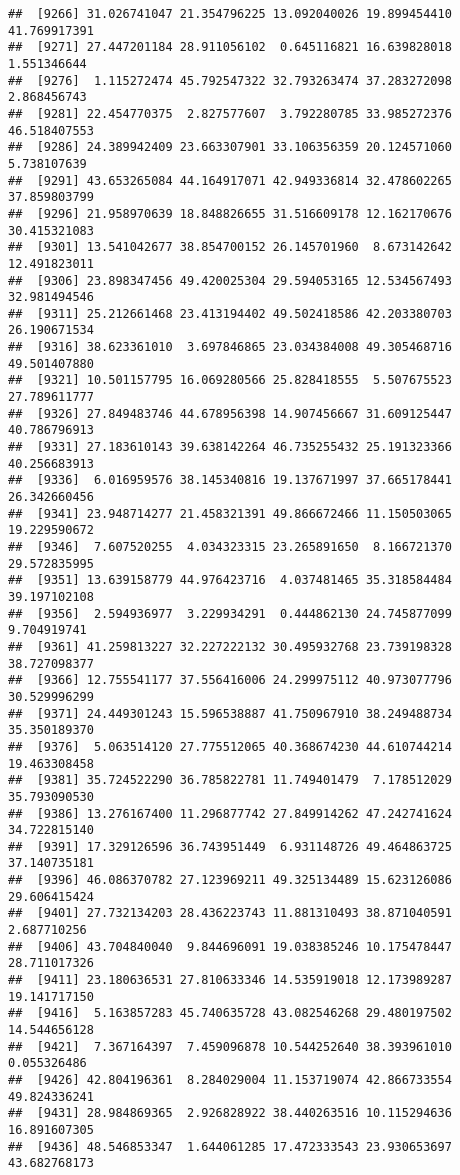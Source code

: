 \documentclass[
]{article}
\begin{document}
\begin{verbatim}
##  [9266] 31.026741047 21.354796225 13.092040026 19.899454410 41.769917391
##  [9271] 27.447201184 28.911056102  0.645116821 16.639828018  1.551346644
##  [9276]  1.115272474 45.792547322 32.793263474 37.283272098  2.868456743
##  [9281] 22.454770375  2.827577607  3.792280785 33.985272376 46.518407553
##  [9286] 24.389942409 23.663307901 33.106356359 20.124571060  5.738107639
##  [9291] 43.653265084 44.164917071 42.949336814 32.478602265 37.859803799
##  [9296] 21.958970639 18.848826655 31.516609178 12.162170676 30.415321083
##  [9301] 13.541042677 38.854700152 26.145701960  8.673142642 12.491823011
##  [9306] 23.898347456 49.420025304 29.594053165 12.534567493 32.981494546
##  [9311] 25.212661468 23.413194402 49.502418586 42.203380703 26.190671534
##  [9316] 38.623361010  3.697846865 23.034384008 49.305468716 49.501407880
##  [9321] 10.501157795 16.069280566 25.828418555  5.507675523 27.789611777
##  [9326] 27.849483746 44.678956398 14.907456667 31.609125447 40.786796913
##  [9331] 27.183610143 39.638142264 46.735255432 25.191323366 40.256683913
##  [9336]  6.016959576 38.145340816 19.137671997 37.665178441 26.342660456
##  [9341] 23.948714277 21.458321391 49.866672466 11.150503065 19.229590672
##  [9346]  7.607520255  4.034323315 23.265891650  8.166721370 29.572835995
##  [9351] 13.639158779 44.976423716  4.037481465 35.318584484 39.197102108
##  [9356]  2.594936977  3.229934291  0.444862130 24.745877099  9.704919741
##  [9361] 41.259813227 32.227222132 30.495932768 23.739198328 38.727098377
##  [9366] 12.755541177 37.556416006 24.299975112 40.973077796 30.529996299
##  [9371] 24.449301243 15.596538887 41.750967910 38.249488734 35.350189370
##  [9376]  5.063514120 27.775512065 40.368674230 44.610744214 19.463308458
##  [9381] 35.724522290 36.785822781 11.749401479  7.178512029 35.793090530
##  [9386] 13.276167400 11.296877742 27.849914262 47.242741624 34.722815140
##  [9391] 17.329126596 36.743951449  6.931148726 49.464863725 37.140735181
##  [9396] 46.086370782 27.123969211 49.325134489 15.623126086 29.606415424
##  [9401] 27.732134203 28.436223743 11.881310493 38.871040591  2.687710256
##  [9406] 43.704840040  9.844696091 19.038385246 10.175478447 28.711017326
##  [9411] 23.180636531 27.810633346 14.535919018 12.173989287 19.141717150
##  [9416]  5.163857283 45.740635728 43.082546268 29.480197502 14.544656128
##  [9421]  7.367164397  7.459096878 10.544252640 38.393961010  0.055326486
##  [9426] 42.804196361  8.284029004 11.153719074 42.866733554 49.824336241
##  [9431] 28.984869365  2.926828922 38.440263516 10.115294636 16.891607305
##  [9436] 48.546853347  1.644061285 17.472333543 23.930653697 43.682768173

\end{verbatim}
\end{document}
